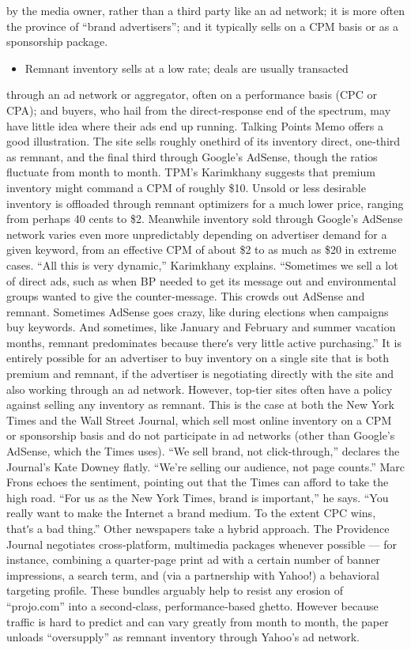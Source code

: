 by the media owner, rather than a third party like an ad network; it
is more often the province of ``brand advertisers''; and it typically
sells on a CPM basis or as a sponsorship package.
\begin{itemize}
\item Remnant inventory sells at a low rate; deals are usually transacted
\end{itemize}
through an ad network or aggregator, often on a performance basis
(CPC or CPA); and buyers, who hail from the direct‐response end
of the spectrum, may have little idea where their ads end up
running.
Talking Points Memo offers a good illustration. The site sells roughly onethird
of its inventory direct, one‐third as remnant, and the final third
through Google’s AdSense, though the ratios fluctuate from month to
month. TPM’s Karimkhany suggests that premium inventory might
command a CPM of roughly \$10. Unsold or less desirable inventory is
offloaded through remnant optimizers for a much lower price, ranging
from perhaps 40 cents to \$2. Meanwhile inventory sold through Google’s
AdSense network varies even more unpredictably depending on
advertiser demand for a given keyword, from an effective CPM of about
\$2 to as much as \$20 in extreme cases.
``All this is very dynamic,'' Karimkhany explains. ``Sometimes we sell a lot
of direct ads, such as when BP needed to get its message out and
environmental groups wanted to give the counter‐message. This crowds
out AdSense and remnant. Sometimes AdSense goes crazy, like during
elections when campaigns buy keywords. And sometimes, like January
and February and summer vacation months, remnant predominates
because thereʹs very little active purchasing.''
It is entirely possible for an advertiser to buy inventory on a single site
that is both premium and remnant, if the advertiser is negotiating directly
with the site and also working through an ad network. However, top‐tier
sites often have a policy against selling any inventory as remnant.
This is the case at both the New York Times and the Wall Street Journal,
which sell most online inventory on a CPM or sponsorship basis and do
not participate in ad networks (other than Google’s AdSense, which the
Times uses). ``We sell brand, not click‐through,'' declares the Journal’s Kate
Downey flatly. ``We’re selling our audience, not page counts.''
Marc Frons echoes the sentiment, pointing out that the Times can afford to
take the high road. ``For us as the New York Times, brand is important,'' he
says. ``You really want to make the Internet a brand medium. To the
extent CPC wins, thatʹs a bad thing.''
Other newspapers take a hybrid approach. The Providence Journal
negotiates cross‐platform, multimedia packages whenever possible — for
instance, combining a quarter‐page print ad with a certain number of
banner impressions, a search term, and (via a partnership with Yahoo!) a
behavioral targeting profile. These bundles arguably help to resist any
erosion of ``projo.com'' into a second‐class, performance‐based ghetto.
However because traffic is hard to predict and can vary greatly from
month to month, the paper unloads ``oversupply'' as remnant inventory
through Yahoo’s ad network.
